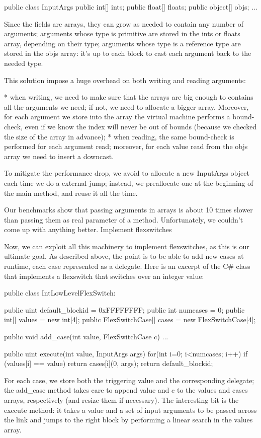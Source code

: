 {public class InputArgs {
public int[] ints;
public float[] floats;
public object[] objs;
...
}

Since the fields are arrays, they can grow as needed to contain any number of arguments; arguments whose type is primitive are stored in the ints or floats array, depending on their type; arguments whose type is a reference type are stored in the objs array: it's up to each block to cast each argument back to the needed type.

This solution impose a huge overhead on both writing and reading arguments:

        * when writing, we need to make sure that the arrays are big enough to contains all the arguments we need; if not, we need to allocate a bigger array. Moreover, for each argument we store into the array the virtual machine performs a bound-check, even if we know the index will never be out of bounds (because we checked the size of the array in advance);
        * when reading, the same bound-check is performed for each argument read; moreover, for each value read from the objs array we need to insert a downcast.

To mitigate the performance drop, we avoid to allocate a new InputArgs object each time we do a external jump; instead, we preallocate one at the beginning of the main method, and reuse it all the time.

Our benchmarks show that passing arguments in arrays is about 10 times slower than passing them as real parameter of a method. Unfortunately, we couldn't come up with anything better.
Implement flexswitches

Now, we can exploit all this machinery to implement flexswitches, as this is our ultimate goal. As described above, the point is to be able to add new cases at runtime, each case represented as a delegate. Here is an excerpt of the C# class that implements a flexswitch that switches over an integer value:

public class IntLowLevelFlexSwitch:
{
public uint default_blockid = 0xFFFFFFFF;
public int numcases = 0;
public int[] values = new int[4];
public FlexSwitchCase[] cases = new FlexSwitchCase[4];

public void add_case(int value, FlexSwitchCase c)
{
...
}

public uint execute(int value, InputArgs args)
{
for(int i=0; i<numcases; i++)
if (values[i] == value) {
 return cases[i](0, args);
}
return default_blockid;
}
}

For each case, we store both the triggering value and the corresponding delegate; the add_case method takes care to append value and c to the values and cases arrays, respectively (and resize them if necessary). The interesting bit is the execute method: it takes a value and a set of input arguments to be passed across the link and jumps to the right block by performing a linear search in the values array.

}
